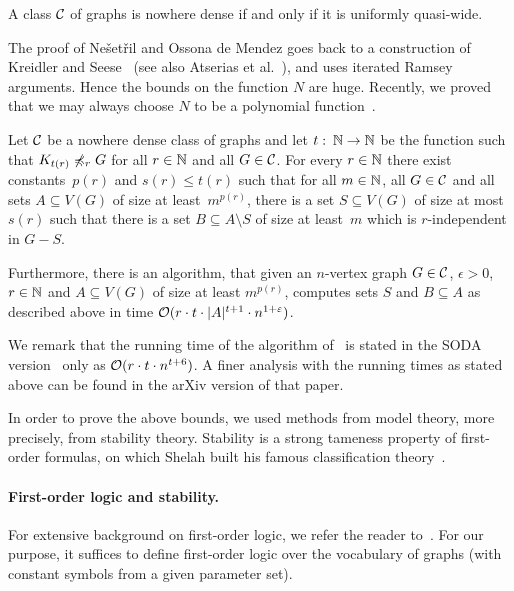 \begin{theorem}
A class $\mathcal{C}$ of graphs is nowhere dense if and only if it
is uniformly quasi-wide. 
\end{theorem}

The proof of Ne\v{s}et\v{r}il and Ossona de Mendez goes back to a construction
of Kreidler and Seese~\cite{kreidler1998monadic} (see also Atserias et al.~\cite{atserias2006preservation}), 
and uses iterated
Ramsey arguments. Hence the bounds on the function $N$ are huge. Recently, 
we proved that we may always choose $N$ to be a polynomial 
function~\cite{siebertz2016polynomial}. 

\begin{theorem}\label{thm:uqw}
  Let $\mathcal{C}$ be a nowhere dense class of graphs and let 
  $t\,\colon\,\mathbb{N}\rightarrow \mathbb{N}$ be the function such that
  $K_{t(r)}\not\preccurlyeq_r G$ for all $r\in \mathbb{N}$ and all $G\in \mathcal{C}$.  
  For every $r\in \mathbb{N}$
  there exist constants~$p(r)$ and $s(r)\leq t(r)$ such that
  for all $m\in \mathbb{N}$, all $G\in\mathcal{C}$ and all sets $A\subseteq V(G)$ of size at 
  least~$m^{p(r)}$, there is a set $S\subseteq V(G)$ of size at
  most $s(r)$ such that there is a set $B\subseteq A\setminus S$ of size at
  least~$m$ which is $r$-independent in $G-S$.
  
  Furthermore, there is an algorithm, that given an $n$-vertex graph
  $G\in \mathcal{C}$, $\epsilon>0$, $r\in \mathbb{N}$ and $A\subseteq V(G)$ of size at least
  $m^{p(r)}$, computes sets $S$ and $B\subseteq A$ as described above
  in
  time $\mathcal{O}(r\cdot t\cdot |A|^{t+1}\cdot n^{1+\varepsilon})$.
\end{theorem}

We remark that the running time of the algorithm of~
is stated in the SODA version~\cite{siebertz2016polynomial} only as 
$\mathcal{O}(r\cdot t\cdot n^{t+6})$. A finer analysis with the running
times as stated above can be found in the arXiv version of that paper.

In order to prove the above bounds, we used methods from model
theory, more precisely, from stability theory. Stability is a strong tameness
property of first-order formulas, on which Shelah built his famous 
classification theory~\cite{shelah1990classification}.


\paragraph{First-order logic and stability.}
For extensive background on first-order logic, we refer the reader
to~\cite{hodges1993model}. For our purpose, it suffices to define
first-order logic over the vocabulary of graphs (with constant symbols
from a given parameter set).
 
